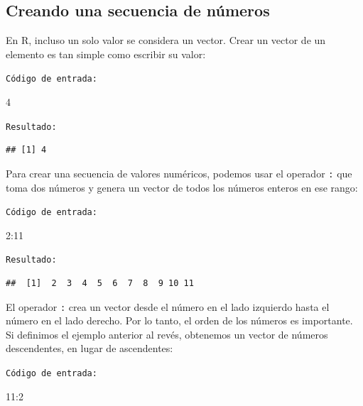 \documentclass[
]{book}
\newenvironment{Shaded}{\begin{snugshade}}{\end{snugshade}}
\newcommand{\DecValTok}[1]{\textcolor[rgb]{0.00,0.00,0.81}{#1}}
\newcommand{\SpecialCharTok}[1]{\textcolor[rgb]{0.00,0.00,0.00}{#1}}
\begin{document}
\hypertarget{creando-una-secuencia-de-nuxfameros}{%
\subsection{Creando una secuencia de números}\label{creando-una-secuencia-de-nuxfameros}}

En R, incluso un solo valor se considera un vector. Crear un vector de un elemento es tan simple como escribir su valor:

\texttt{Código\ de\ entrada:}

\begin{Shaded}
\begin{Highlighting}[]
\DecValTok{4}
\end{Highlighting}
\end{Shaded}

\texttt{Resultado:}

\begin{verbatim}
## [1] 4
\end{verbatim}

Para crear una secuencia de valores numéricos, podemos usar el operador \texttt{:} que toma dos números y genera un vector de todos los números enteros en ese rango:

\texttt{Código\ de\ entrada:}

\begin{Shaded}
\begin{Highlighting}[]
\DecValTok{2}\SpecialCharTok{:}\DecValTok{11}
\end{Highlighting}
\end{Shaded}

\texttt{Resultado:}

\begin{verbatim}
##  [1]  2  3  4  5  6  7  8  9 10 11
\end{verbatim}

El operador \texttt{:} crea un vector desde el número en el lado izquierdo hasta el número en el lado derecho. Por lo tanto, el orden de los números es importante. Si definimos el ejemplo anterior al revés, obtenemos un vector de números descendentes, en lugar de ascendentes:

\texttt{Código\ de\ entrada:}

\begin{Shaded}
\begin{Highlighting}[]
\DecValTok{11}\SpecialCharTok{:}\DecValTok{2}
\end{Highlighting}
\end{Shaded}
\end{document}

